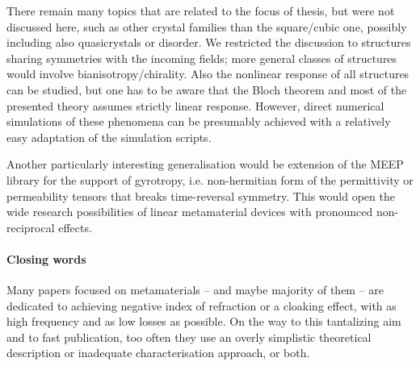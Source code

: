 
%	  

There remain many topics that are related to the focus of thesis, but were not discussed here, such as other crystal families than the square/cubic one, possibly including also quasicrystals or disorder. We restricted the discussion to structures sharing symmetries with the incoming fields; more general classes of structures would involve bianisotropy/chirality. Also the nonlinear response of all structures can be studied, but one has to be aware that the Bloch theorem and most of the presented theory assumes strictly linear response. However, direct numerical simulations of these phenomena can be presumably  achieved with a relatively easy adaptation of the simulation scripts.

Another particularly interesting generalisation would be extension of the MEEP library for the support of gyrotropy, i.e. non-hermitian form of the permittivity or permeability tensors that breaks time-reversal symmetry. This would open the wide research possibilities of linear metamaterial devices with pronounced non-reciprocal effects.

\paragraph{Closing words} 
Many papers focused on metamaterials -- and maybe majority of them -- are dedicated to achieving negative index of refraction or a cloaking effect, with as high frequency and as low losses as possible.
On the way to this tantalizing aim and to fast publication, too often they use an overly simplistic theoretical description or inadequate characterisation approach, or both. %

